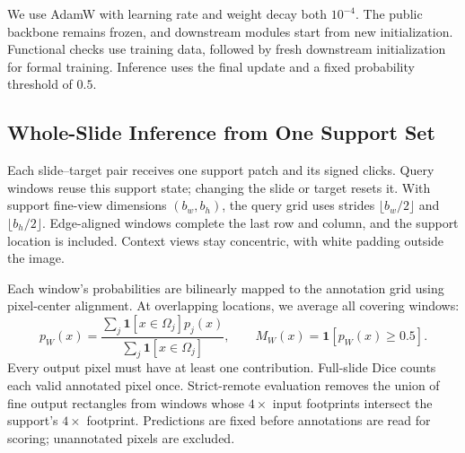 We use AdamW with learning rate and weight decay both $10^{-4}$. The public backbone remains frozen, and downstream modules start from new initialization. Functional checks use training data, followed by fresh downstream initialization for formal training. Inference uses the final update and a fixed probability threshold of $0.5$.

\subsection{Whole-Slide Inference from One Support Set}
\label{sec:wsi}
Each slide--target pair receives one support patch and its signed clicks. Query windows reuse this support state; changing the slide or target resets it. With support fine-view dimensions $(b_w,b_h)$, the query grid uses strides $\lfloor b_w/2\rfloor$ and $\lfloor b_h/2\rfloor$. Edge-aligned windows complete the last row and column, and the support location is included. Context views stay concentric, with white padding outside the image.

Each window's probabilities are bilinearly mapped to the annotation grid using pixel-center alignment. At overlapping locations, we average all covering windows:
\begin{equation}
 p_W(x)=\frac{\sum_j\mathbf{1}[x\in\Omega_j]p_j(x)}
                   {\sum_j\mathbf{1}[x\in\Omega_j]},\qquad
 M_W(x)=\mathbf{1}[p_W(x)\geq0.5].
\end{equation}
Every output pixel must have at least one contribution. Full-slide Dice counts each valid annotated pixel once. Strict-remote evaluation removes the union of fine output rectangles from windows whose $4\times$ input footprints intersect the support's $4\times$ footprint. Predictions are fixed before annotations are read for scoring; unannotated pixels are excluded.

